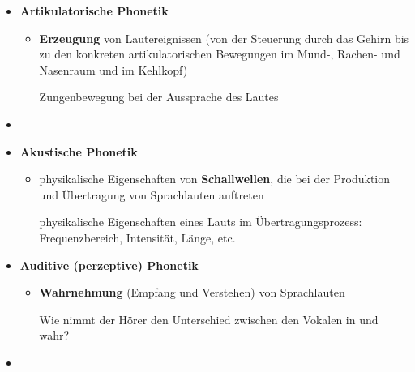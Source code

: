 
\begin{frame}

	\begin{itemize}
		\item \textbf{Artikulatorische Phonetik}
		
		\begin{itemize}
			\item \textbf{Erzeugung} von Lautereignissen (von der Steuerung durch das Gehirn bis zu den konkreten artikulatorischen Bewegungen im Mund-, Rachen- und Nasenraum und im Kehlkopf)

			\ea Zungenbewegung bei der Aussprache des Lautes \textipa{[ \t{tS} ]}
			\z

		\end{itemize}
		
		\item[]
		\item \textbf{Akustische Phonetik}
		
		\begin{itemize}
			\item physikalische Eigenschaften von \textbf{Schallwellen}, die bei der Produktion und Übertragung von Sprachlauten auftreten

			\ea physikalische Eigenschaften eines Lauts im Übertragungsprozess: Frequenzbereich, Intensität, Länge, etc.
			\z
			
		\end{itemize}
		
	\end{itemize}
	
\end{frame}




\begin{frame}

	\begin{itemize}
	
		\item \textbf{Auditive (perzeptive) Phonetik}
		
		\begin{itemize}
			\item \textbf{Wahrnehmung} (Empfang und Verstehen) von Sprachlauten

			\ea Wie nimmt der Hörer den Unterschied zwischen den Vokalen in  und  wahr?
			\z
			
		\end{itemize}
		
		\item[]
	\end{itemize}
	
\end{frame}




